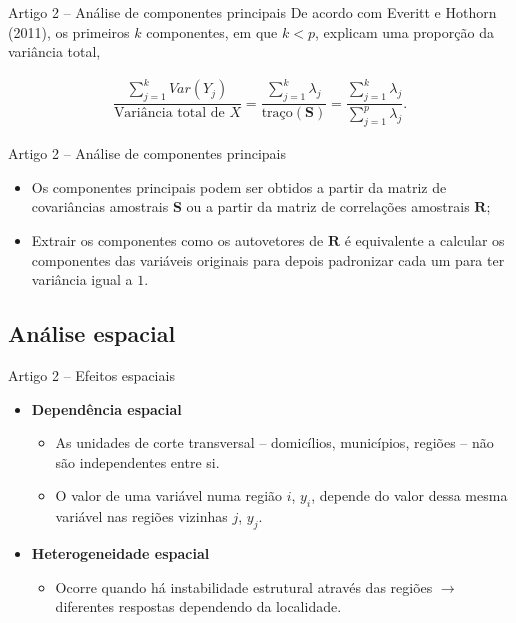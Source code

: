 \documentclass[aspectratio=169]{beamer}
\begin{document}
\begin{frame}{Artigo 2 -- Análise de componentes principais}
    De acordo com Everitt e Hothorn (2011), os primeiros $k$ componentes, em que $k < p$, explicam uma proporção da variância total,
    \begin{block}{}
        \begin{align*}
            \dfrac{\displaystyle\sum_{j=1}^{k}Var(Y_j)}{\textrm{Variância total de } X} = \dfrac{\displaystyle\sum_{j=1}^{k}\lambda_j}{\textrm{traço}(\boldsymbol{S})} = \dfrac{\displaystyle\sum_{j=1}^{k}\lambda_j}{\displaystyle\sum_{j=1}^{p}\lambda_j}.
        \end{align*}    
    \end{block}
\end{frame}

\begin{frame}{Artigo 2 -- Análise de componentes principais}
    \begin{itemize}
        \item Os componentes principais podem ser obtidos a partir da matriz de covariâncias amostrais $\boldsymbol{S}$ ou a partir da matriz de correlações amostrais $\boldsymbol{R}$;
        \vspace{0.5cm}
        \item Extrair os componentes como os autovetores de $\boldsymbol{R}$ é equivalente a calcular os componentes das variáveis originais para depois padronizar cada um para ter variância igual a $1$.
    \end{itemize}
\end{frame}

\subsection{Análise espacial}

\begin{frame}{Artigo 2 -- Efeitos espaciais}
	\begin{itemize}
		\item \textbf{Dependência espacial}
		\vspace{0.25cm}
		\begin{itemize}
		    \item As unidades de corte transversal -- domicílios, municípios, regiões -- não são independentes entre si.
		    \item O valor de uma variável numa região $i$, $y_i$, depende do valor dessa mesma variável nas regiões vizinhas $j$, $y_j$. 
		\end{itemize}
		\item \textbf{Heterogeneidade espacial}
		\vspace{0.25cm}
		\begin{itemize}
			\item Ocorre quando há instabilidade estrutural através das regiões $\rightarrow$ diferentes respostas dependendo da localidade.
		\end{itemize}
	\end{itemize}
\end{frame}
\end{document}
